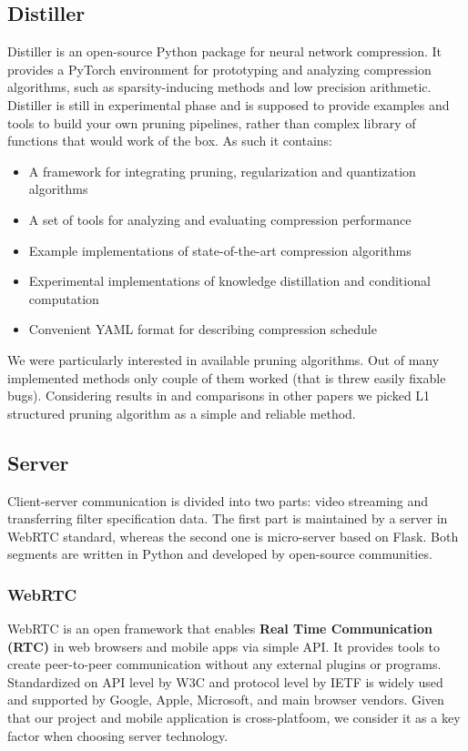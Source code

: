 \documentclass[../Main.tex]{subfiles}
\begin{document}
    \subsection{Distiller}
    Distiller is an open-source Python package for neural network compression.
    It provides a PyTorch environment for prototyping and analyzing compression algorithms,
    such as sparsity-inducing methods and low precision arithmetic. Distiller
    is still in experimental phase and is supposed to provide examples and tools
    to build your own pruning pipelines, rather than complex library of functions
    that would work of the box. As such it contains:
    \begin{itemize}
    \item A framework for integrating pruning, regularization and quantization algorithms
    \item A set of tools for analyzing and evaluating compression performance
    \item Example implementations of state-of-the-art compression algorithms
    \item Experimental implementations of knowledge distillation and conditional
          computation
    \item Convenient YAML format for describing compression schedule
    \end{itemize}
    We were particularly interested in available pruning algorithms.
    Out of many implemented methods only couple of them worked (that is threw easily
    fixable bugs). Considering results in \cite{li2016pruning} and comparisons
    in other papers we picked L1 structured pruning algorithm as a simple and reliable 
    method.


\newpage
\subsection{Server}
    Client-server communication is divided into two parts: video streaming and transferring filter specification data. The first part is maintained by a server in WebRTC standard, whereas the second one is micro-server based on Flask. Both segments are written in Python and developed by open-source communities.

    \subsubsection{WebRTC}
    WebRTC is an open framework that enables \textbf{Real Time Communication (RTC)} in web browsers and mobile apps via simple API. It provides tools to create peer-to-peer communication without any external plugins or programs. Standardized on API level by W3C 
    and protocol level by IETF 
    is widely used and supported by Google, Apple, Microsoft, and main browser vendors. Given that our project and mobile application is cross-platfoom, we consider it as a key factor when choosing server technology.
    
\end{document}
